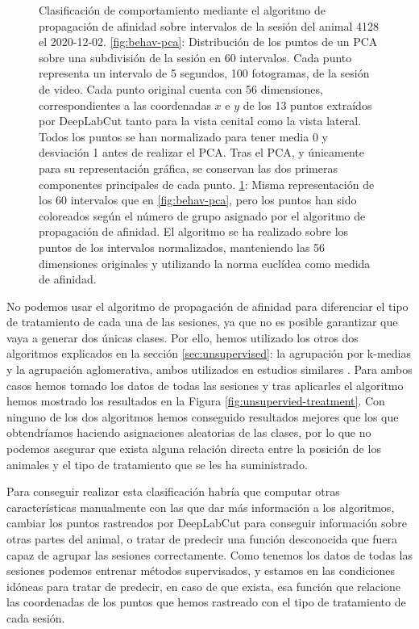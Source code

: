 \begin{figure}[h]
\begin{subfigure}{0.45\textwidth}
    \caption{}
    \label{fig:behav-aff}
  \end{subfigure}
  \caption[Clasificación no supervisada de comportamiento.]{Clasificación de comportamiento mediante el algoritmo de propagación de afinidad sobre intervalos de la sesión del animal 4128 el 2020-12-02. \ref{fig:behav-pca}: Distribución de los puntos de un PCA sobre una subdivisión de la sesión en 60 intervalos. Cada punto representa un intervalo de 5 segundos, 100 fotogramas, de la sesión de video. Cada punto original cuenta con 56 dimensiones, correspondientes a las coordenadas $ x $ e $ y $ de los 13 puntos extraídos por DeepLabCut tanto para la vista cenital como la vista lateral. Todos los puntos se han normalizado para tener media 0 y desviación 1 antes de realizar el PCA. Tras el PCA, y únicamente para su representación gráfica, se conservan las dos primeras componentes principales de cada punto. \ref{fig:behav-aff}: Misma representación de los 60 intervalos que en \ref{fig:behav-pca}, pero los puntos han sido coloreados según el número de grupo asignado por el algoritmo de propagación de afinidad. El algoritmo se ha realizado sobre los puntos de los intervalos normalizados, manteniendo las 56 dimensiones originales y utilizando la norma euclídea como medida de afinidad.}
  \label{fig:unsupervied-behav}
\end{figure}

No podemos usar el algoritmo de propagación de afinidad para diferenciar el tipo de tratamiento de cada una de las sesiones, ya que no es posible garantizar que vaya a generar dos únicas clases. Por ello, hemos utilizado los otros dos algoritmos explicados en la sección \ref{sec:unsupervised}: la agrupación por k-medias y la agrupación aglomerativa, ambos utilizados en estudios similares \cite{frontiers}. Para ambos casos hemos tomado los datos de todas las sesiones y tras aplicarles el algoritmo hemos mostrado los resultados en la Figura \ref{fig:unsupervied-treatment}. Con ninguno de los dos algoritmos hemos conseguido resultados mejores que los que obtendríamos haciendo asignaciones aleatorias de las clases, por lo que no podemos asegurar que exista alguna relación directa entre la posición de los animales y el tipo de tratamiento que se les ha suministrado.

Para conseguir realizar esta clasificación habría que computar otras características manualmente con las que dar más información a los algoritmos, cambiar los puntos rastreados por DeepLabCut para conseguir información sobre otras partes del animal, o tratar de predecir una función desconocida que fuera capaz de agrupar las sesiones correctamente. Como tenemos los datos de todas las sesiones podemos entrenar métodos supervisados, y estamos en las condiciones idóneas para tratar de predecir, en caso de que exista, esa función que relacione las coordenadas de los puntos que hemos rastreado con el tipo de tratamiento de cada sesión.

